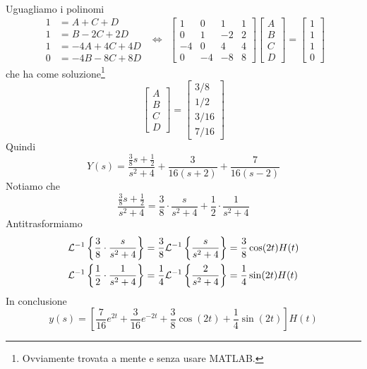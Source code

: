 Uguagliamo i polinomi
\begin{equation*}
\begin{aligned}
1 & = A + C + D\\
1 & = B - 2C + 2D\\
1 & = - 4A + 4C + 4D\\
0 & = - 4B - 8C + 8D
\end{aligned} \ \ \iff \ \ 
\begin{bmatrix}
1 & 0 & 1 & 1\\
0 & 1 & - 2 & 2\\
- 4 & 0 & 4 & 4\\
0 & - 4 & - 8 & 8
\end{bmatrix}
\begin{bmatrix}
A\\
B\\
C\\
D
\end{bmatrix} = 
\begin{bmatrix}
1\\
1\\
1\\
0
\end{bmatrix}
\end{equation*}
che ha come soluzione\footnote{Ovviamente trovata a mente e senza usare MATLAB.}
\begin{equation*}
\begin{bmatrix}
A\\
B\\
C\\
D
\end{bmatrix} = 
\begin{bmatrix}
3/8\\
1/2\\
3/16\\
7/16
\end{bmatrix}
\end{equation*}
Quindi
\begin{equation*}
Y(s) = \frac{\frac{3}{8} s + \frac{1}{2}}{s^{2} + 4} + \frac{3}{16(s + 2)} + \frac{7}{16(s - 2)}
\end{equation*}
Notiamo che
\begin{equation*}
\frac{\frac{3}{8} s + \frac{1}{2}}{s^{2} + 4} = \frac{3}{8} \cdot \frac{s}{s^{2} + 4} + \frac{1}{2} \cdot \frac{1}{s^{2} + 4}
\end{equation*}
Antitrasformiamo
\begin{align*}
\mathcal{L}^{ - 1}\left\{\frac{3}{8} \cdot \frac{s}{s^{2} + 4}\right\} & = \frac{3}{8}\mathcal{L}^{ - 1}\left\{\frac{s}{s^{2} + 4}\right\} = \frac{3}{8}\cos(2t) H(t)\\
\mathcal{L}^{ - 1}\left\{\frac{1}{2} \cdot \frac{1}{s^{2} + 4}\right\} & = \frac{1}{4}\mathcal{L}^{ - 1}\left\{\frac{2}{s^{2} + 4}\right\} = \frac{1}{4}\sin(2t) H(t)
\end{align*}
In conclusione
\begin{equation*}
y(s) = \left[\frac{7}{16} e^{2t} + \frac{3}{16} e^{ - 2t} + \frac{3}{8}\cos(2t) + \frac{1}{4}\sin(2t)\right] H(t)
\end{equation*}

